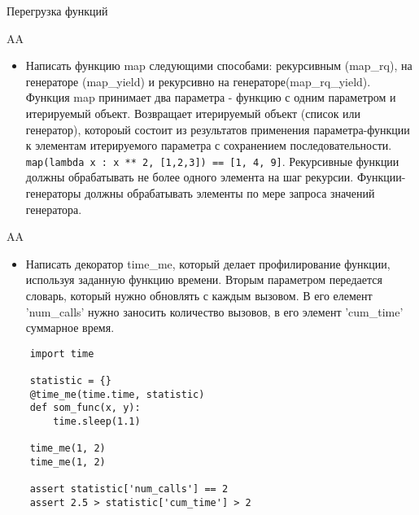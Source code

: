 \documentclass{article}
\begin{document}
\begin{center} Перегрузка функций \end{center}
\newpage

\begin{center} AA \end{center}
\begin{itemize}
    \item Написать функцию map следующими способами: рекурсивным (map\_rq), 
        на генераторе (map\_yield) и рекурсивно на генераторе(map\_rq\_yield).
        Функция map принимает два параметра - функцию с одним параметром и итерируемый объект. 
        Возвращает итерируемый объект (список или генератор), котороый состоит из результатов
        применения параметра-функции к элементам итерируемого параметра с сохранением последовательности.
        \lstinline!map(lambda x : x ** 2, [1,2,3]) == [1, 4, 9]!.
        Рекурсивные функции должны обрабатывать не более одного элемента на шаг рекурсии.
        Функции-генераторы должны обрабатывать элементы по мере запроса значений генератора.
\end{itemize}
\newpage

\begin{center} AA \end{center}
\begin{itemize}
    \item Написать декоратор time\_me, который делает профилирование функции, 
        используя заданную функцию времени. Вторым параметром передается словарь,
        который нужно обновлять с каждым вызовом. В его елемент 'num\_calls' нужно
        заносить количество вызовов, в его элемент 'cum\_time' суммарное время.
\end{itemize}
\vspace{15pt}
\begin{lstlisting}
    import time

    statistic = {}
    @time_me(time.time, statistic)
    def som_func(x, y):
        time.sleep(1.1)

    time_me(1, 2)
    time_me(1, 2)

    assert statistic['num_calls'] == 2
    assert 2.5 > statistic['cum_time'] > 2
\end{lstlisting}
\newpage
\end{document}
